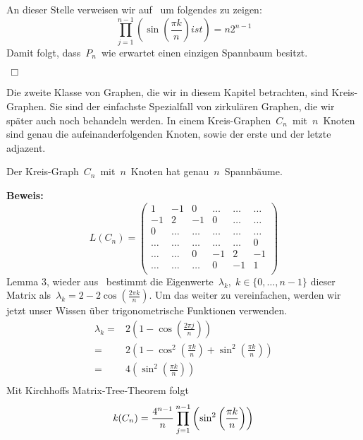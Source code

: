 An dieser Stelle verweisen wir auf~\cite{fiktor_2010} um folgendes zu zeigen:
\begin{equation}
 \prod_{j=1}^{n-1} \left(\sin\left(\frac{\pi k}{n}\right) ist \right)=n2^{n-1}
 \label{fiktor}
\end{equation}
Damit folgt, dass $\,P_n\,$ wie erwartet einen einzigen Spannbaum besitzt.
\begin{flushright} $\,\Box\,$ \end{flushright}
Die zweite Klasse von Graphen, die wir in diesem Kapitel betrachten, sind Kreis-Graphen.
Sie sind der einfachste Spezialfall von zirkulären Graphen, die wir später auch noch behandeln werden. In einem Kreis-Graphen $\,C_n\,$ mit $\,n\,$ Knoten sind genau die aufeinanderfolgenden Knoten, sowie der erste und der letzte adjazent. 
\begin{Lms}
 Der Kreis-Graph $\,C_n\,$ mit $\,n\,$ Knoten hat genau $\,n\,$ Spannbäume.
\end{Lms}
\textbf{Beweis:}
\begin{equation}
L(C_n)=
\begin{pmatrix}
1&-1&0&\ldots&\ldots&\ldots\\
-1&2&-1&0&\ldots&\ldots\\
0&\ldots&\ldots&\ldots&\ldots&\ldots\\
\ldots&\ldots&\ldots&\ldots&\ldots&0\\
\ldots&\ldots&0&-1&2&-1\\
\ldots&\ldots&\ldots&0&-1&1\\
\end{pmatrix}
\end{equation}
Lemma 3, wieder aus~\cite{daoud_2014} bestimmt die Eigenwerte $\,\lambda_k,\; k \in \{0,\ldots,n-1\}$
dieser Matrix als $\,\lambda_k = 2-2\cos {\left(\frac{2\pi k}{n}\right)}$.\; 
Um das weiter zu vereinfachen, werden wir jetzt unser Wissen über trigonometrische Funktionen verwenden.
\begin{equation}
\begin{split}
 \lambda_k={} & 2 \left(1-\cos \left(\frac{2\pi j}{n}\right)\right)\\
 = {}&2 \left( 1 - \cos^2\left(\frac{\pi k}{n}\right)+\sin^2\left(\frac{\pi k}{n}\right) \right)\\
 = {}& 4 \left(\sin^2\left(\frac{\pi k}{n}\right) \right)\\
\end{split}
\label{ewc}
\end{equation}
Mit Kirchhoffs Matrix-Tree-Theorem folgt
\begin{equation}
 \mathit{k}(C_n)=\frac{4^{n-1}}{n}\prod_{j=1}^{n-1} \left(\sin^2\left(\frac{\pi k}{n}\right) \right)\\
\end{equation}
